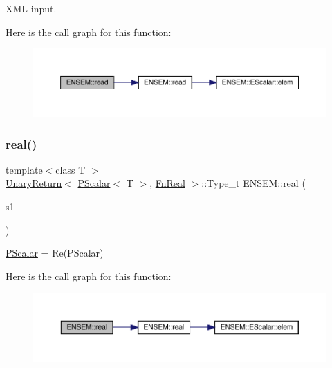 X\+ML input. 

Here is the call graph for this function\+:\nopagebreak
\begin{figure}[H]
\begin{center}
\leavevmode
\includegraphics[width=350pt]{db/dcc/group__primscalar_ga882ac6046905c4b049ed86cd7668b32a_cgraph}
\end{center}
\end{figure}
\mbox{\label{group__primscalar_gac01f1564e4c432779ff00f12778275cf}} 
\subsubsection{\texorpdfstring{real()}{real()}}
{\footnotesize\ttfamily template$<$class T $>$ \\
\mbox{\hyperlink{structENSEM_1_1UnaryReturn}{Unary\+Return}}$<$ \mbox{\hyperlink{classENSEM_1_1PScalar}{P\+Scalar}}$<$ T $>$, \mbox{\hyperlink{structENSEM_1_1FnReal}{Fn\+Real}} $>$\+::Type\+\_\+t E\+N\+S\+E\+M\+::real (\begin{DoxyParamCaption}\item[{const \mbox{\hyperlink{classENSEM_1_1PScalar}{P\+Scalar}}$<$ T $>$ \&}]{s1 }\end{DoxyParamCaption})\hspace{0.3cm}{\ttfamily [inline]}}



\mbox{\hyperlink{classENSEM_1_1PScalar}{P\+Scalar}} = Re(\+P\+Scalar) 

Here is the call graph for this function\+:\nopagebreak
\begin{figure}[H]
\begin{center}
\leavevmode
\includegraphics[width=350pt]{db/dcc/group__primscalar_gac01f1564e4c432779ff00f12778275cf_cgraph}
\end{center}
\end{figure}
\mbox{\label{group__primscalar_ga63efc63157b5fc9495798f0391c8e170}} 
